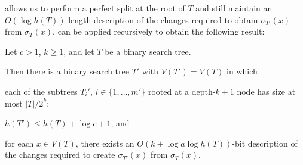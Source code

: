 \documentclass[kpfonts]{patmorin}
\begin{document}
 allows us to perform a perfect split at the root of $T$ and still maintain an $O(\log h(T))$-length description of the changes required to obtain $\sigma_{T'}(x)$ from $\sigma_T(x)$.   can be applied recursively to obtain the following result:

\begin{lem}
  Let $c>1$, $k\ge 1$, and let $T$ be a binary search tree.

  Then there is a binary search tree $T'$ with $V(T')=V(T)$ in which
  \begin{compactenum}
    \item  each of the subtrees $T_i'$, $i\in\{1,\ldots,m'\}$ rooted at a depth-$k+1$ node has size at most $|T|/2^k$;
    
    \item $h(T')\le h(T)+\log c+1$; and
    
    \item for each $x\in V(T)$, there exists an $O(k+\log a\log h(T))$-bit description of the changes required to create $\sigma_{T'}(x)$ from $\sigma_T(x)$.
  \end{compactenum}
\end{lem}
\end{document}
